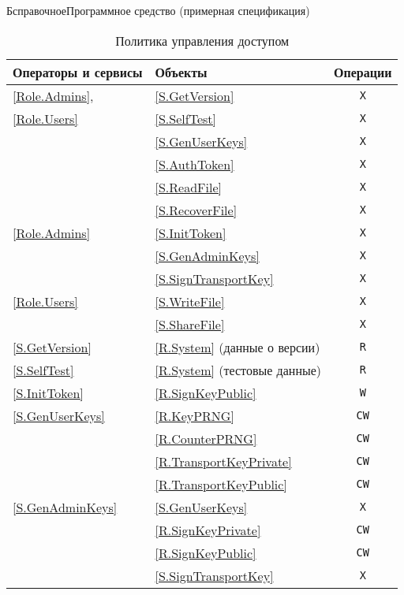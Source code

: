 \begin{appendix}{Б}{справочное}{Программное средство \CryptoDisk 
(примерная спецификация)}
\begin{table}[p]
\caption{Политика управления доступом \CryptoDisk}
\label{Table.CryptoDisk.DAC}
\begin{tabular}{|p{5cm}|p{8.7cm}|c|}
\hline
Операторы и сервисы & Объекты & Операции\\
\hline
\hline
\ref{Role.Admins},        & \ref{S.GetVersion} & \texttt{X}\\
\ref{Role.Users}          & \ref{S.SelfTest} & \texttt{X}\\
                          & \ref{S.GenUserKeys} & \texttt{X}\\
                          & \ref{S.AuthToken} & \texttt{X}\\
                          & \ref{S.ReadFile} & \texttt{X}\\
                          & \ref{S.RecoverFile} & \texttt{X}\\
\hline
\ref{Role.Admins}         & \ref{S.InitToken} & \texttt{X}\\
                          & \ref{S.GenAdminKeys} & \texttt{X}\\
                          & \ref{S.SignTransportKey} & \texttt{X}\\
\hline
\ref{Role.Users}          & \ref{S.WriteFile} & \texttt{X}\\
                          & \ref{S.ShareFile} & \texttt{X}\\
\hline
\hline
\ref{S.GetVersion}& \ref{R.System} (данные о версии) & \texttt{R}\\
\hline
\ref{S.SelfTest}& \ref{R.System} (тестовые данные) & \texttt{R}\\
\hline
\ref{S.InitToken} & \ref{R.SignKeyPublic} & \texttt{W}\\
\hline
\ref{S.GenUserKeys}  & \ref{R.KeyPRNG}& \texttt{CW}\\
                     & \ref{R.CounterPRNG}& \texttt{CW}\\
                     & \ref{R.TransportKeyPrivate}& \texttt{CW}\\
                     & \ref{R.TransportKeyPublic}& \texttt{CW}\\
\hline
\ref{S.GenAdminKeys} & \ref{S.GenUserKeys}& \texttt{X}\\
                     & \ref{R.SignKeyPrivate}& \texttt{CW}\\
                     & \ref{R.SignKeyPublic}& \texttt{CW}\\
                     & \ref{S.SignTransportKey}& \texttt{X}\\

\end{tabular}
\end{table}
\end{appendix}
